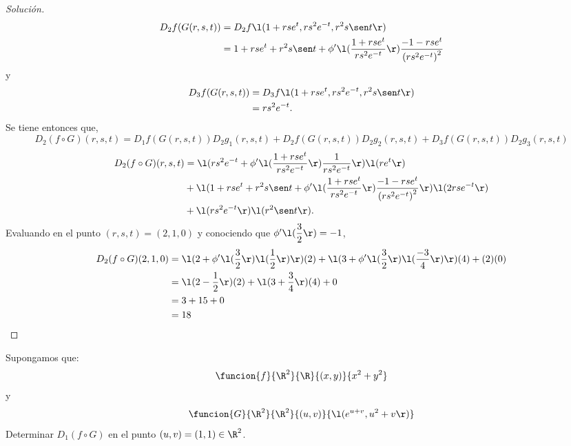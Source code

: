 \documentclass[a4,11pt]{aleph-notas}
\begin{document}
\begin{proof}[Solución]
	\[
        \begin{aligned}
	    D_2f(G(r,s,t))&= D_2f\l(1+rse^t,rs^2e^{-t},r^2s \sen t\r)\\&=1+rse^t + r^2s \sen t + \phi' \l( \dfrac{1+rse^t}{rs^2e^{-t}} \r) \dfrac{-1-rse^t}{\left(rs^2e^{-t}\right)^2}
        \end{aligned}
    \]
    y
	\[
        \begin{aligned}
	    D_3f(G(r,s,t))&= D_3f\l(1+rse^t,rs^2e^{-t},r^2s \sen t\r)\\&=rs^2e^{-t}.
        \end{aligned}
    \]
    Se tiene entonces que,
	\[
	    D_2(f \circ G)(r,s,t)=D_1f(G(r,s,t))D_2g_1(r,s,t)+D_2f(G(r,s,t))D_2g_2(r,s,t)+D_3f(G(r,s,t))D_2g_3(r,s,t)
    \]
    \[
        \begin{aligned}
	    D_2(f \circ G)(r,s,t)&=\l(rs^2e^{-t} + \phi' \l( \dfrac{1+rse^t}{rs^2e^{-t}} \r) \dfrac{1}{rs^2e^{-t}}\r) \l(re^t\r) \\ &+ \l(1+rse^t + r^2s \sen t + \phi' \l( \dfrac{1+rse^t}{rs^2e^{-t}} \r) \dfrac{-1-rse^t}{\left(rs^2e^{-t}\right)^2}\r) \l(2rse^{-t}\r) \\ &+ \l(rs^2e^{-t}\r) \l(r^2 \sen t\r).
        \end{aligned}
    \]
    Evaluando en el punto $(r,s,t)=(2,1,0)$ y conociendo que $\phi' \l(\dfrac{3}{2}\r)=-1 $,
    \[
        \begin{aligned}
	    D_2(f \circ G)(2,1,0)&=\l(2+\phi' \l( \dfrac{3}{2}\r) \l(\dfrac{1}{2}\r)\r)(2) + \l(3+ \phi' \l( \dfrac{3}{2}\r)\l(\dfrac{-3}{4}\r)\r)(4) + (2)(0)\\
        &=\l(2- \dfrac{1}{2}\r)(2) + \l(3+ \dfrac{3}{4}\r)(4) + 0\\
        &=3+15+0\\
        &=18
        \end{aligned}
    \]
\end{proof}

\begin{ejer}
Supongamos que:
	\[
        \funcion{f}{\R^2}{\R}{(x,y)}
        {x^2+y^2}
    \]
    y
    \[
        \funcion{G}{\R^2}{\R^2}{(u,v)}
        {\l(e^{u+v},u^2+v\r)}
    \]
    Determinar $D_1(f \circ G) $ en el punto $(u,v)=(1,1) \in \R^2$.
\end{ejer}
\end{document}
